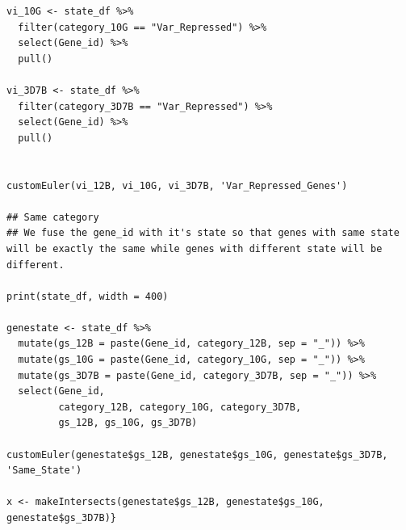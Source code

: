 \documentclass[11pt]{article}
\begin{document}
\begin{verbatim}
vi_10G <- state_df %>%
  filter(category_10G == "Var_Repressed") %>%
  select(Gene_id) %>%
  pull()

vi_3D7B <- state_df %>%
  filter(category_3D7B == "Var_Repressed") %>%
  select(Gene_id) %>%
  pull()


customEuler(vi_12B, vi_10G, vi_3D7B, 'Var_Repressed_Genes')

## Same category
## We fuse the gene_id with it's state so that genes with same state will be exactly the same while genes with different state will be different.

print(state_df, width = 400)

genestate <- state_df %>%
  mutate(gs_12B = paste(Gene_id, category_12B, sep = "_")) %>%
  mutate(gs_10G = paste(Gene_id, category_10G, sep = "_")) %>%
  mutate(gs_3D7B = paste(Gene_id, category_3D7B, sep = "_")) %>%
  select(Gene_id,
         category_12B, category_10G, category_3D7B,
         gs_12B, gs_10G, gs_3D7B)

customEuler(genestate$gs_12B, genestate$gs_10G, genestate$gs_3D7B, 'Same_State')

x <- makeIntersects(genestate$gs_12B, genestate$gs_10G, genestate$gs_3D7B)}
\end{verbatim}
\end{document}
